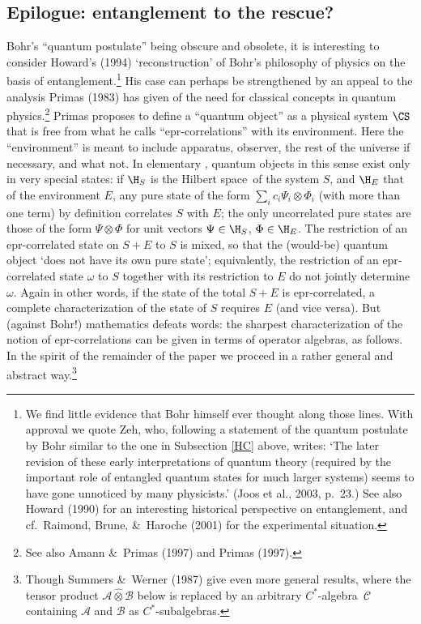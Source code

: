 \documentclass[12pt]{article}
\newcommand{\epr}{{\sc epr}}
\newcommand{\ca}{$C^*$-algebra} \newcommand{\jba}{JB-algebra}
\newcommand{\Hs}{Hilbert space} \newcommand{\Bs}{Banach space}
\newcommand{\ot}{\otimes}
\newcommand{\om}{\omega} \newcommand{\Om}{\Omega}
\newcommand{\CA}{{\mathcal A}} \newcommand{\CB}{{\mathcal B}}
\newcommand{\CC}{{\mathcal C}} \newcommand{\CF}{{\mathcal F}}
\begin{document}
\subsection{Epilogue: entanglement to the rescue?}\label{primas}
Bohr's ``quantum postulate'' being obscure and obsolete, it is interesting to consider Howard's (1994)  `reconstruction' of Bohr's philosophy of physics on the basis of entanglement.\footnote{We find little evidence that Bohr himself ever thought along those lines.  With approval we quote Zeh, who, following a statement of the quantum postulate by Bohr similar to the one in Subsection \ref{HC} above, writes: 
`The later revision of these early interpretations of quantum theory (required by the important role of entangled quantum states for much larger systems) seems to have gone unnoticed by many physicists.' (Joos et al., 2003, p.\ 23.) 
See also Howard (1990) for an interesting historical perspective on entanglement, and cf.\ 
Raimond, Brune,  \&\ Haroche (2001) for the experimental situation.
} His case can perhaps be strengthened by an appeal to the analysis Primas (1983) has given of the need for classical concepts in quantum physics.\footnote{See also Amann \&\ Primas (1997) and Primas (1997).}
Primas proposes to define a ``quantum object'' as a physical system $\CS$ that  is free from what he calls ``\epr-correlations'' with its environment. Here the ``environment'' is meant to include apparatus, observer, the rest of the universe if necessary, and what not.  In elementary \qm,  quantum objects in this sense exist only in very special states: if $\H_S$ is the \Hs\ of the system $S$, and $\H_E$ that of the environment $E$, any pure state of the form
$\sum_i c_i \Psi_i\ot\Phi_i$ (with more than one term) by definition correlates $S$ with $E$; the only uncorrelated pure states are those of the form $\Psi\ot\Phi$ for unit vectors $\Psi\in \H_S$, $\Phi\in\H_E$.
The restriction of an \epr-correlated state on $S+E$ to $S$ is mixed, so that the (would-be) quantum object `does not have its own pure state'; equivalently, the restriction of an \epr-correlated state $\om$ to $S$ together with its restriction to $E$ do not jointly determine $\om$. Again in other words, if the state of the total $S+E$ is \epr-correlated, a complete characterization of the state of $S$ requires $E$ (and vice versa). But (against Bohr!) mathematics defeats words: the sharpest characterization of the notion of \epr-correlations can be given in terms of operator algebras, as follows.  
In the spirit of the remainder of the paper we proceed in a rather general and abstract way.\footnote{Though Summers \&\ Werner (1987) give even more general results, where the tensor product $\CA\hat{\ot}\CB$ below is replaced
by an arbitrary \ca\ $\CC$ containing $\CA$ and $\CB$ as $C^*$-subalgebras.
}
\end{document}
